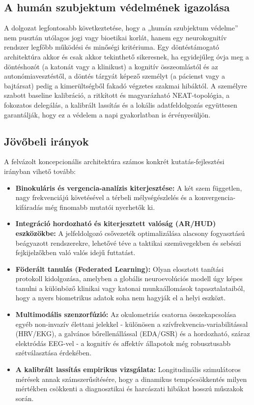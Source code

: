 \documentclass[12pt,a4paper,oneside]{book}
\begin{document}
\subsection{A humán szubjektum védelmének igazolása}

A dolgozat legfontosabb következtetése, hogy a „humán szubjektum védelme” nem pusztán utólagos jogi vagy bioetikai korlát, hanem egy neurokognitív rendszer legfőbb működési és minőségi kritériuma. Egy döntéstámogató architektúra akkor és csak akkor tekinthető sikeresnek, ha egyidejűleg óvja meg a döntéshozót (a katonát vagy a klinikust) a kognitív összeomlástól és az autonómiavesztéstől, a döntés tárgyát képező személyt (a pácienst vagy a bajtársat) pedig a kimerültségből fakadó végzetes szakmai hibáktól. A személyre szabott baseline kalibráció, a ritkított és magyarázható NEAT-topológia, a fokozatos delegálás, a kalibrált lassítás és a lokális adatfeldolgozás együttesen garantálják, hogy ez a védelem a napi gyakorlatban is érvényesüljön.

\subsection{Jövőbeli irányok}

A felvázolt koncepcionális architektúra számos konkrét kutatás-fejlesztési irányban vihető tovább:
\begin{itemize}
    \item \textbf{Binokuláris és vergencia-analízis kiterjesztése:} A két szem független, nagy frekvenciájú követésével a térbeli mélységészlelés és a konvergencia-kifáradás még finomabb mutatói nyerhetők ki.
    \item \textbf{Integráció hordozható és kiterjesztett valóság (AR/HUD) eszközökbe:} A jelfeldolgozó csővezeték optimalizálása alacsony fogyasztású beágyazott rendszerekre, lehetővé téve a taktikai szemüvegekben és sebészi fejkijelzőkben való valós idejű futtatást.
    \item \textbf{Föderált tanulás (Federated Learning):} Olyan elosztott tanítási protokoll kidolgozása, amelyben a globális neuroevolúciós modell úgy képes tanulni a különböző klinikai vagy katonai munkaállomások tapasztalataiból, hogy a nyers biometrikus adatok soha nem hagyják el a helyi eszközt.
    \item \textbf{Multimodális szenzorfúzió:} Az okulometriás csatorna összekapcsolása egyéb non-invazív élettani jelekkel - különösen a szívfrekvencia-variabilitással (HRV/EKG), a galvános bőrellenállással (EDA/GSR) és a hordozható, száraz elektródás EEG-vel - a kognitív és affektív állapotok még robusztusabb szétválasztása érdekében.
    \item \textbf{A kalibrált lassítás empirikus vizsgálata:} Longitudinális szimulátoros mérések annak számszerűsítésére, hogy a dinamikus tempócsökkentés milyen mértékben csökkenti a diagnosztikai és harcászati hibákat hosszú műszakok során.
\end{itemize}
\end{document}
